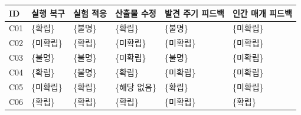 \begin{tabular}{lp{.16\linewidth}p{.16\linewidth}p{.16\linewidth}p{.16\linewidth}p{.16\linewidth}}
\toprule
ID & 실행 복구 & 실험 적응 & 산출물 수정 & 발견 주기 피드백 & 인간 매개 피드백 \\
\midrule
C01 & \{확립\} & \{불명\} & \{확립\} & \{불명\} & \{미확립\} \\
C02 & \{미확립\} & \{확립\} & \{미확립\} & \{미확립\} & \{미확립\} \\
C03 & \{불명\} & \{불명\} & \{미확립\} & \{불명\} & \{미확립\} \\
C04 & \{확립\} & \{불명\} & \{확립\} & \{미확립\} & \{미확립\} \\
C05 & \{미확립\} & \{확립\} & \{해당 없음\} & \{확립\} & \{미확립\} \\
C06 & \{확립\} & \{확립\} & \{확립\} & \{미확립\} & \{확립\} \\
\bottomrule
\end{tabular}
